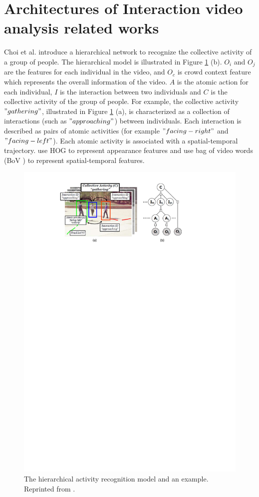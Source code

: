 \section{Architectures of Interaction video analysis related works}
\label{2_1}
Choi et al. \cite{choi2012} introduce a hierarchical network to recognize the collective activity of a group of people. The hierarchical model is illustrated in Figure \ref{fig:hierA} (b). \(O_i\) and \(O_j\) are the features for each individual in the video, and \(O_c\) is crowd context feature which represents the overall information of the video. \(A\) is the atomic action for each individual, \(I\) is the interaction between two individuals and \(C\) is the collective activity of the group of people. For example, the collective activity \("gathering"\), illustrated in Figure \ref{fig:hierA} (a), is characterized as a collection of interactions (such as \("approaching"\)) between individuals. Each interaction is described as pairs of atomic activities (for example \("facing-right"\) and \("facing-left"\)). Each atomic activity is associated with a spatial-temporal trajectory. \cite{choi2012} use HOG to represent appearance features and use bag of video words (BoV \cite{bov}) to represent spatial-temporal features.
\begin{figure}
	\includegraphics[trim=2cm 22.5cm 0cm 1cm]{figs/hier.pdf}
	\caption{The hierarchical activity recognition model and an example. Reprinted from \cite{choi2012}.}
	\label{fig:hierA}
\end{figure}
